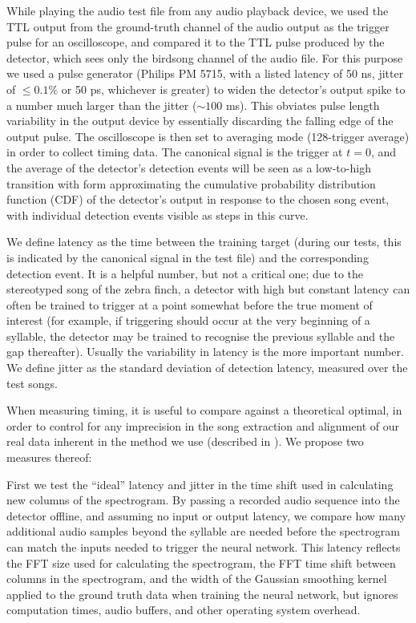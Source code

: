 \documentclass[10pt,letterpaper]{article}
\begin{document}
While playing the audio test file from any audio playback device, we
used the TTL output from the ground-truth channel of the audio output
as the trigger pulse for an oscilloscope, and compared it to the TTL
pulse produced by the detector, which sees only the birdsong channel
of the audio file. For this purpose we used a pulse generator (Philips
PM 5715, with a listed latency of 50 ns, jitter of $\leq 0.1\%$ or 50
ps, whichever is greater) to widen the detector's output spike to a
number much larger than the jitter ($\sim 100$ ms).  This obviates
pulse length variability in the output device by essentially
discarding the falling edge of the output pulse.  The oscilloscope is
then set to averaging mode (128-trigger average) in order to collect
timing data. The canonical signal is the trigger at $t=0$, and the
average of the detector's detection events will be seen as a
low-to-high transition with form approximating the cumulative
probability distribution function (CDF) of the detector's output in
response to the chosen song event, with individual detection events
visible as steps in this curve.

We define latency as the time between the training target (during our tests, this is indicated by the canonical
signal in the test file) and the corresponding detection event.  It is a helpful number,
but not a critical one; due to the stereotyped song of the zebra finch, a detector with high but
constant latency can often be trained to trigger at a point somewhat
before the true moment of interest (for example, if triggering should
occur at the very beginning of a syllable, the detector may be trained 
to recognise the previous syllable and the gap thereafter).  Usually the 
variability in latency is the more important number.  We define jitter as 
the standard deviation of detection latency, measured over the test songs.

When measuring timing, it is useful to compare against a theoretical
optimal, in order to control for any imprecision in the song
extraction and alignment of our real data inherent in the method we
use (described in \cite{Poole2012}).  We propose two measures thereof:

First we test the ``ideal'' latency and jitter in the time shift used
in calculating new columns of the spectrogram. By passing a recorded
audio sequence into the detector offline, and assuming no input or
output latency, we compare how many additional audio samples beyond
the syllable are needed before the spectrogram can match the inputs
needed to trigger the neural network.  This latency reflects the FFT
size used for calculating the spectrogram, the FFT time shift between
columns in the spectrogram, and the width of the Gaussian smoothing
kernel applied to the ground truth data when training the neural
network, but ignores computation times, audio buffers, and other
operating system overhead.
\end{document}
